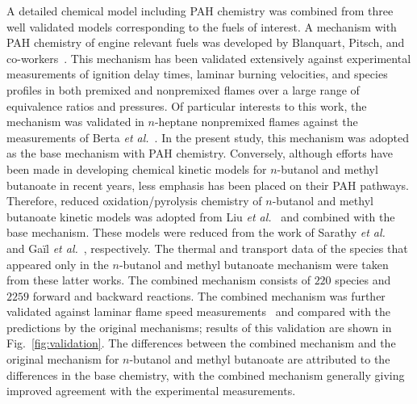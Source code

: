 \documentclass[review,3p,times]{elsarticleUS}
\begin{document}
A detailed chemical model including PAH chemistry was combined from three well validated models corresponding to the fuels of interest. A mechanism with PAH chemistry of engine relevant fuels was developed by Blanquart, Pitsch, and co-workers~\cite{blanquart09b,narayanaswamy10}. This mechanism has been validated extensively against experimental measurements of ignition delay times, laminar burning velocities, and species profiles in both premixed and nonpremixed flames over a large range of equivalence ratios and pressures. Of particular interests to this work, the mechanism was validated in $n$-heptane nonpremixed flames against the measurements of Berta \emph{et al.}~\cite{berta06}. In the present study, this mechanism was adopted as the base mechanism with PAH chemistry. Conversely, although efforts have been made in developing chemical kinetic models for $n$-butanol and methyl butanoate in recent years, less emphasis has been placed on their PAH pathways. Therefore, reduced oxidation/pyrolysis chemistry 
of $n$-butanol and methyl butanoate kinetic models was adopted from Liu \emph{et al.}~\cite{liu11} and combined with the base mechanism. These models were reduced from the work of Sarathy \emph{et al.}~\cite{sarathy09} and Ga\"il \emph{et al.}~\cite{gail08}, respectively. The thermal and transport data of the species that appeared only in the $n$-butanol and methyl butanoate mechanism were taken from these latter works. The combined mechanism consists of $220$ species and $2259$ forward and backward reactions. The combined mechanism  was further validated against laminar flame speed measurements~\cite{liu11} and compared with the predictions by the original mechanisms; results of this validation are shown in Fig.~\ref{fig:validation}. The differences between the combined mechanism and the original mechanism for $n$-butanol and methyl butanoate are attributed to the differences in the base chemistry, with the combined mechanism generally giving improved agreement with the experimental measurements.
\end{document}
